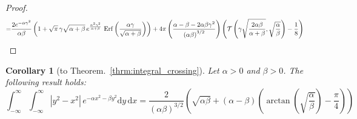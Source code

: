 \documentclass[journal]{IEEEtran}
\theoremstyle{plain}
\newtheorem{corollary}[theorem]{Corollary}
\theoremstyle{definition}
\theoremstyle{remark}
\newcommand{\Ot}{\mathcal{T}}
\newcommand{\Erf}{\operatorname{Erf}}
\newcommand{\dd}{\mathrm{d}}
\begin{document}
\begin{proof}
\begin{equation}
\begin{split}
    =& \frac{2e^{-\alpha \gamma^2}}{\alpha\beta} \left(1 + \sqrt{\pi} \, \gamma \sqrt{\alpha + \beta}  \, e^{\frac{\alpha^2 \gamma^2}{\alpha + \beta}}  \, \Erf\left(\frac{\alpha \gamma}{\sqrt{\alpha + \beta}}\right)\right) + 4 \pi \left(\frac{\alpha - \beta - 2\alpha \beta \gamma^2}{\left(\alpha\beta\right)^{3/2}}\right) \left(\Ot\left(\gamma\sqrt{\frac{2\alpha\beta}{\alpha+\beta}}, \sqrt{\frac{\alpha}{\beta}}\right)-\frac{1}{8}\right)
\end{split}
\raisetag{150pt}
\end{equation}
\end{proof}

\begin{corollary}[to Theorem.~\ref{thrm:integral_crossing}]
Let $\alpha > 0$ and $\beta > 0$. The following result holds:
\begin{equation}
 \int_{-\infty}^\infty \int_{-\infty}^\infty \left|y^2-x^2\right|\, e^{-\alpha x^2-\beta y^2} \dd y \, \dd x = \frac{2}{\left(\alpha \beta\right)^{3/2}} \left(\sqrt{\alpha \beta} + \left(\alpha-\beta\right)\left(\arctan\left( \sqrt{\frac{\alpha}{\beta}}\right) -\frac{\pi}{4}\right)\right)
\end{equation}
\end{corollary}
\end{document}
